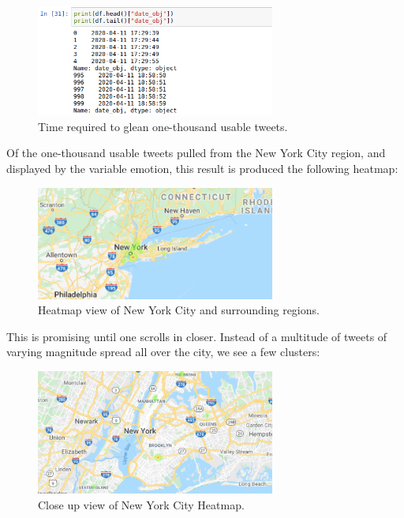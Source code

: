 \documentclass[12pt, oneside]{article}
\begin{document}
\begin{figure}[H]
\centering
\includegraphics[width=0.7\textwidth]{time}
  \caption{Time required to glean one-thousand usable tweets.}
\end{figure}


Of the one-thousand usable
tweets pulled from the New York City region, and
displayed by the variable emotion, this result is produced the following
heatmap:

\begin{figure}[H]
\centering
\includegraphics[width=0.7\textwidth]{nyClose}
  \caption{Heatmap view of New York City and surrounding regions.}
  \label{fig:ny1}
\end{figure}

This is promising until one scrolls in closer. Instead of a multitude of tweets
of varying magnitude spread all over the city, we see a few clusters:

\begin{figure}[H]
\centering
\includegraphics[width=0.7\textwidth]{NyBoroughs}
  \caption{Close up view of New York City Heatmap.}
  \label{fig:ny2}
\end{figure}
\end{document}
